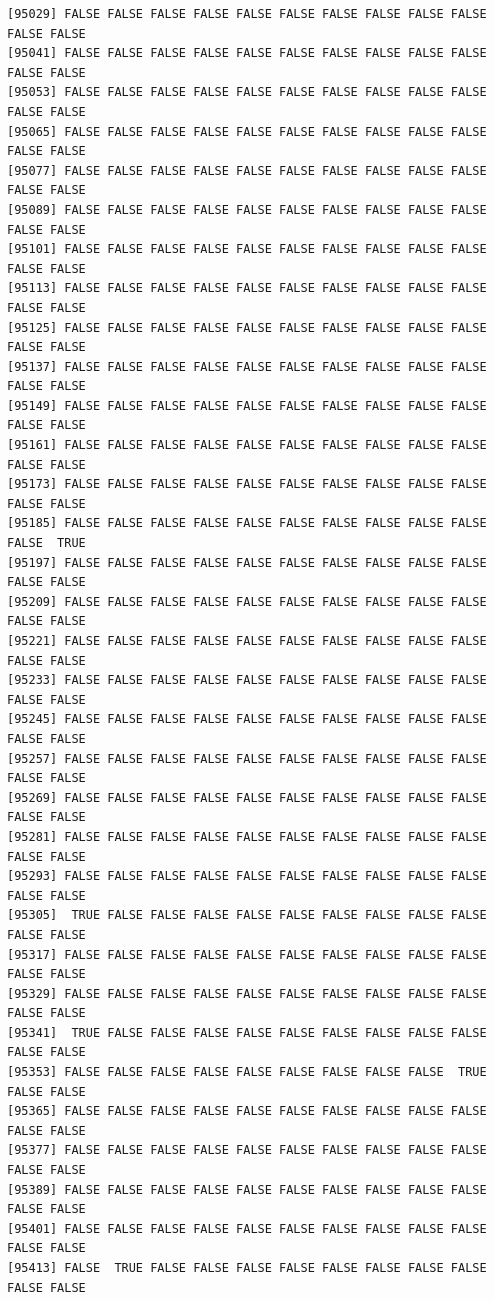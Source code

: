 \documentclass[
  a4paper,
  DIV=11,
  numbers=noendperiod]{scrartcl}
\begin{document}
\begin{verbatim}
[95029] FALSE FALSE FALSE FALSE FALSE FALSE FALSE FALSE FALSE FALSE FALSE FALSE
[95041] FALSE FALSE FALSE FALSE FALSE FALSE FALSE FALSE FALSE FALSE FALSE FALSE
[95053] FALSE FALSE FALSE FALSE FALSE FALSE FALSE FALSE FALSE FALSE FALSE FALSE
[95065] FALSE FALSE FALSE FALSE FALSE FALSE FALSE FALSE FALSE FALSE FALSE FALSE
[95077] FALSE FALSE FALSE FALSE FALSE FALSE FALSE FALSE FALSE FALSE FALSE FALSE
[95089] FALSE FALSE FALSE FALSE FALSE FALSE FALSE FALSE FALSE FALSE FALSE FALSE
[95101] FALSE FALSE FALSE FALSE FALSE FALSE FALSE FALSE FALSE FALSE FALSE FALSE
[95113] FALSE FALSE FALSE FALSE FALSE FALSE FALSE FALSE FALSE FALSE FALSE FALSE
[95125] FALSE FALSE FALSE FALSE FALSE FALSE FALSE FALSE FALSE FALSE FALSE FALSE
[95137] FALSE FALSE FALSE FALSE FALSE FALSE FALSE FALSE FALSE FALSE FALSE FALSE
[95149] FALSE FALSE FALSE FALSE FALSE FALSE FALSE FALSE FALSE FALSE FALSE FALSE
[95161] FALSE FALSE FALSE FALSE FALSE FALSE FALSE FALSE FALSE FALSE FALSE FALSE
[95173] FALSE FALSE FALSE FALSE FALSE FALSE FALSE FALSE FALSE FALSE FALSE FALSE
[95185] FALSE FALSE FALSE FALSE FALSE FALSE FALSE FALSE FALSE FALSE FALSE  TRUE
[95197] FALSE FALSE FALSE FALSE FALSE FALSE FALSE FALSE FALSE FALSE FALSE FALSE
[95209] FALSE FALSE FALSE FALSE FALSE FALSE FALSE FALSE FALSE FALSE FALSE FALSE
[95221] FALSE FALSE FALSE FALSE FALSE FALSE FALSE FALSE FALSE FALSE FALSE FALSE
[95233] FALSE FALSE FALSE FALSE FALSE FALSE FALSE FALSE FALSE FALSE FALSE FALSE
[95245] FALSE FALSE FALSE FALSE FALSE FALSE FALSE FALSE FALSE FALSE FALSE FALSE
[95257] FALSE FALSE FALSE FALSE FALSE FALSE FALSE FALSE FALSE FALSE FALSE FALSE
[95269] FALSE FALSE FALSE FALSE FALSE FALSE FALSE FALSE FALSE FALSE FALSE FALSE
[95281] FALSE FALSE FALSE FALSE FALSE FALSE FALSE FALSE FALSE FALSE FALSE FALSE
[95293] FALSE FALSE FALSE FALSE FALSE FALSE FALSE FALSE FALSE FALSE FALSE FALSE
[95305]  TRUE FALSE FALSE FALSE FALSE FALSE FALSE FALSE FALSE FALSE FALSE FALSE
[95317] FALSE FALSE FALSE FALSE FALSE FALSE FALSE FALSE FALSE FALSE FALSE FALSE
[95329] FALSE FALSE FALSE FALSE FALSE FALSE FALSE FALSE FALSE FALSE FALSE FALSE
[95341]  TRUE FALSE FALSE FALSE FALSE FALSE FALSE FALSE FALSE FALSE FALSE FALSE
[95353] FALSE FALSE FALSE FALSE FALSE FALSE FALSE FALSE FALSE  TRUE FALSE FALSE
[95365] FALSE FALSE FALSE FALSE FALSE FALSE FALSE FALSE FALSE FALSE FALSE FALSE
[95377] FALSE FALSE FALSE FALSE FALSE FALSE FALSE FALSE FALSE FALSE FALSE FALSE
[95389] FALSE FALSE FALSE FALSE FALSE FALSE FALSE FALSE FALSE FALSE FALSE FALSE
[95401] FALSE FALSE FALSE FALSE FALSE FALSE FALSE FALSE FALSE FALSE FALSE FALSE
[95413] FALSE  TRUE FALSE FALSE FALSE FALSE FALSE FALSE FALSE FALSE FALSE FALSE

\end{verbatim}
\end{document}
